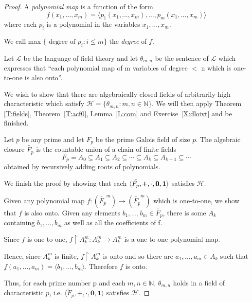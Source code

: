\documentclass[titlepage, oneside]{amsbook}
\theoremstyle{plain}
\theoremstyle{definition}
\theoremstyle{remark}
\begin{document}
\begin{proof} A \emph{polynomial map} is a function of the form \[
f(x_{1}, \dots , x_{m}) =\langle p_{1} (x_{1}, \dots, x_{m}), \dots,
p_{m}(x_{1}, \dots, x_{m}) \rangle \] where each $p_{i}$ is a
polynomial in the variables $x_{1}, \dots , x_{m}$.

We call max $\{ \mbox{ degree of } p_{i} : i \leq m\} $ the \emph{degree} 
of $f$.

Let $\mathcal{L}$ be the language of field theory and let $\theta_{m,n}$ 
be the sentence of $\mathcal{L}$ which expresses that
``each polynomial map of m variables of degree $<$ n which is
one-to-one 
is also onto''. 

We wish to show that there are algebraically closed fields of arbitrarily 
high characteristic which satisfy $\mathcal H = \{ \theta_{m,n} : m,n \in 
\mathbb{N} \}$. We will then apply Theorem \ref{T:fields},
Theorem~\ref{T:acf0}, Lemma~\ref{L:com} and Exercise~\ref{X:dloivt}
and be 
finished.

Let $p$ be any prime and let $F_{p}$ be the prime Galois field of size 
$p$. The algebraic closure $\tilde{F_{p}}$ is the countable union of a 
chain of finite fields 
\[F_{p}=A_{0}  \subseteq A_{1 } 
\subseteq A_{2 } \subseteq \cdots  \subseteq A_{ k} 
\subseteq A_{ k+1} \subseteq \cdots \]
obtained by recursively adding roots of polynomials.

We finish the proof by showing that each $\langle \tilde{F_{p}},
\pmb{+}, \bf{\cdot}, \bf{0}, \bf{1} \rangle$ satisfies $\mathcal H$.

Given any polynomial  map $f:(\tilde{F_{p}}^{m}) \to 
(\tilde{F_{p}}^{m})$ which is one-to-one, we show that $f$ is also
onto.  Given  any elements $b_{1}, \dots 
,b_{m} \in \tilde{F_{p}} $, there is some $A_{k}$ containing $b_{1}
, 
\dots , b_{m} $ as well as all the coefficients of f.

Since $f$ is one-to-one, $f \! \upharpoonright \! A_{k}^{m}  :A_{k}^{m}  \to 
A_{k}^{m} $ is a one-to-one polynomial map.

Hence, since $A_{k}^{m}$ is finite, $f \! \upharpoonright \! A_{k}^{m}$ is onto 
and so there are $a_{1}, \dots ,a_{m} \in A_{k}$ such that $f(a_{1}, 
\dots, a_{m}) =\langle b_{1}, \dots ,b_{m} \rangle$. Therefore $f$ is
onto.

Thus, for each prime number p and each $m,n \in \mathbb{N}$,
$\theta_{m,n}$ holds in a field of characteristic $p$,  i.e.
$\langle \tilde{F}_{p} , \pmb{+} , \pmb{\cdot} , \pmb{0} , \pmb{1}
\rangle$ satisfies
$\mathcal H$.



\end{proof}
\end{document}
